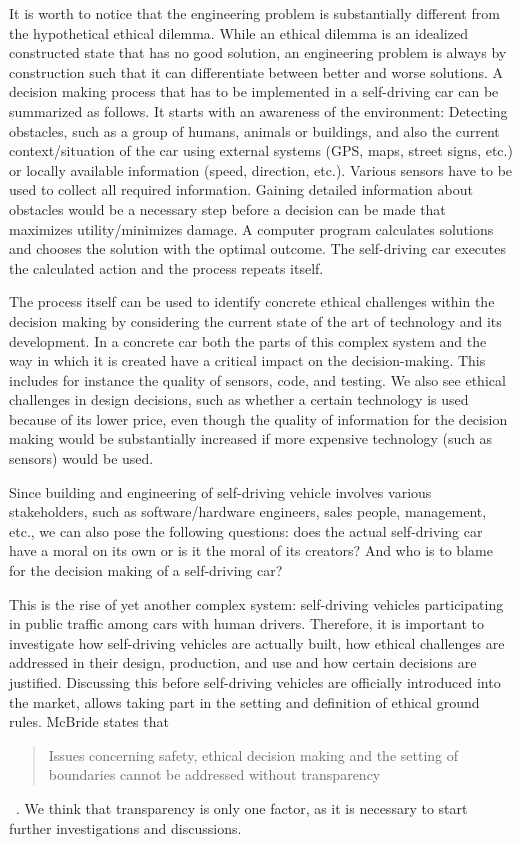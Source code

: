It is worth to notice that the engineering problem is substantially different from the hypothetical ethical dilemma. While an ethical dilemma is an idealized constructed state that has no good solution, an engineering problem is always by construction such that it can differentiate between better and worse solutions. A decision making process that has to be implemented in a self-driving car can be summarized as follows. It starts with an awareness of the environment: Detecting obstacles, such as a group of humans, animals or buildings, and also the current context/situation of the car using external systems (GPS, maps, street signs, etc.) or locally available information (speed, direction, etc.). Various sensors have to be used to collect all required information. Gaining detailed information about obstacles would be a necessary step before a decision can be made that maximizes utility/minimizes damage. A computer program calculates solutions and chooses the solution with the optimal outcome. The self-driving car executes the calculated action and the process repeats itself.

The process itself can be used to identify concrete ethical challenges within the decision making by considering the current state of the art of technology and its development. In a concrete car both the parts of this complex system and the way in which it is created have a critical impact on the decision-making. This includes for instance the quality of sensors, code, and testing. We also see ethical challenges in design decisions, such as whether a certain technology is used because of its lower price, even though the quality of information for the decision making would be substantially increased if more expensive technology (such as sensors) would be used.

Since building and engineering of self-driving vehicle involves various stakeholders, such as software/hardware engineers, sales people, management, etc., we can also pose the following questions: does the actual self-driving car have a moral on its own or is it the moral of its creators? And who is to blame for the decision making of a self-driving car?

This is the rise of yet another complex system: self-driving vehicles participating in public traffic among cars with human drivers. Therefore, it is important to investigate how self-driving vehicles are actually built, how ethical challenges are addressed in their design, production, and use and how certain decisions are justified. Discussing this before self-driving vehicles are officially introduced into the market, allows taking part in the setting and definition of ethical ground rules. McBride states that \blockquote{Issues concerning safety, ethical decision making and the setting of boundaries cannot be addressed without transparency}~\cite{McBride:2016:EDC:2874239.2874265}. We think that transparency is only one factor, as it is necessary to start further investigations and discussions. 

